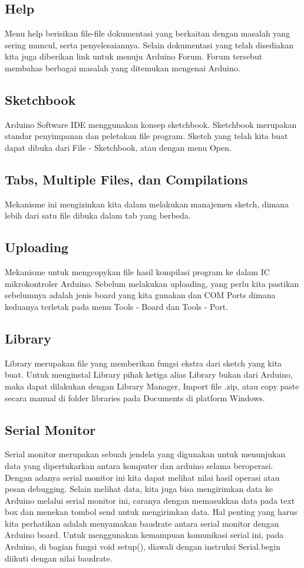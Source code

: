 \subsection{Help}
Menu help berisikan file-file dokumentasi yang berkaitan dengan masalah yang sering muncul, serta penyelesaiannya. Selain dokumentasi yang telah disediakan kita juga diberikan link untuk menuju Arduino Forum. Forum tersebut membahas berbagai masalah yang ditemukan mengenai Arduino.

\subsection{Sketchbook}
Arduino Software IDE menggunakan konsep sketchbook. Sketchbook merupakan standar penyimpanan dan peletakan file program. Sketch yang telah kita buat dapat dibuka dari File - Sketchbook, atau dengan menu Open.

\subsection{Tabs, Multiple Files, dan Compilations}
Mekanisme ini mengizinkan kita dalam melakukan manajemen sketch, dimana lebih dari satu file dibuka dalam tab yang berbeda.

\subsection{Uploading}
Mekanisme untuk mengcopykan file hasil kompilasi program ke dalam IC mikrokontroler Arduino. Sebelum melakukan uploading, yang perlu kita pastikan sebelumnya adalah jenis board yang kita gunakan dan COM Ports dimana keduanya terletak pada menu Tools - Board dan Tools - Port.

\subsection{Library}
Library merupakan file yang memberikan fungsi ekstra dari sketch yang kita buat. Untuk menginstal Library pihak ketiga alias Library bukan dari Arduino, maka dapat dilakukan dengan Library Manager, Import file .zip, atau copy paste secara manual di folder libraries pada Documents di platform Windows.

\subsection{Serial Monitor}

Serial monitor merupakan sebuah jendela yang digunakan untuk menunjukan data yang dipertukarkan antara komputer dan arduino selama beroperasi. Dengan adanya serial monitor ini kita dapat melihat nilai hasil operasi atau pesan debugging. Selain melihat data, kita juga bisa mengirimkan data ke Arduino melalui serial monitor ini, caranya dengan memasukkan data pada text box dan menekan tombol send untuk mengirimkan data. Hal penting yang harus kita perhatikan adalah menyamakan baudrate antara serial monitor dengan Arduino board. Untuk menggunakan kemampuan komunikasi serial ini, pada Arduino, di bagian fungsi void setup(), diawali dengan instruksi Serial.begin diikuti dengan nilai baudrate.


